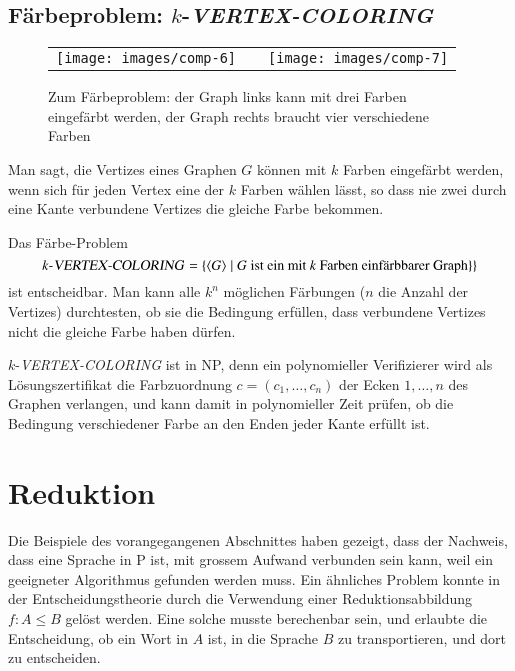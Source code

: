 \subsection{Färbeproblem: \texorpdfstring{$k$}{k}-\textsl{VERTEX-COLORING}}
\begin{figure}
\begin{center}
\begin{tabular}{ccc}
\texttt{[image: images/comp-6]}&
\qquad&\qquad
\texttt{[image: images/comp-7]}
\end{tabular}
\end{center}
\caption{Zum Färbeproblem: der Graph links kann mit drei Farben
eingefärbt werden, der Graph rechts braucht vier verschiedene Farben
\label{vertex-coloring-examples}}
\end{figure}%
Man sagt, die Vertizes eines Graphen $G$ können mit $k$ Farben
eingefärbt werden, wenn sich für jeden Vertex eine der $k$ Farben
wählen lässt, so dass nie zwei durch eine Kante verbundene Vertizes
die gleiche Farbe bekommen.

Das Färbe-Problem 
\[
\text{$k$-\textsl{VERTEX-COLORING}}
=
\{
\langle G\rangle\;|\;
\text{$G$ ist ein mit $k$ Farben einfärbbarer Graph}\}
\}
\]
ist entscheidbar. Man kann alle $k^n$ möglichen Färbungen
($n$ die Anzahl der Vertizes) durchtesten, ob sie die Bedingung
erfüllen, dass verbundene Vertizes nicht die gleiche Farbe haben
dürfen.

$k$-\textsl{VERTEX-COLORING} ist in NP, denn ein polynomieller Verifizierer
wird als Lösungszertifikat die Farbzuordnung $c=(c_1,\dots,c_n)$ der
Ecken $1,\dots,n$ des Graphen verlangen, und kann damit in polynomieller
Zeit prüfen, ob die Bedingung verschiedener Farbe an den Enden
jeder Kante erfüllt ist.

\section{Reduktion}
Die Beispiele des vorangegangenen Abschnittes haben gezeigt,
dass der Nachweis, dass eine Sprache in P ist, mit grossem
Aufwand verbunden sein kann, weil ein geeigneter Algorithmus
gefunden werden muss. Ein ähnliches Problem konnte in der
Entscheidungstheorie durch die Verwendung einer Reduktionsabbildung
$f\colon A\le B$
gelöst werden. Eine solche musste berechenbar sein, und erlaubte
die Entscheidung, ob ein Wort in $A$ ist, in die Sprache
$B$ zu transportieren, und dort zu entscheiden.

